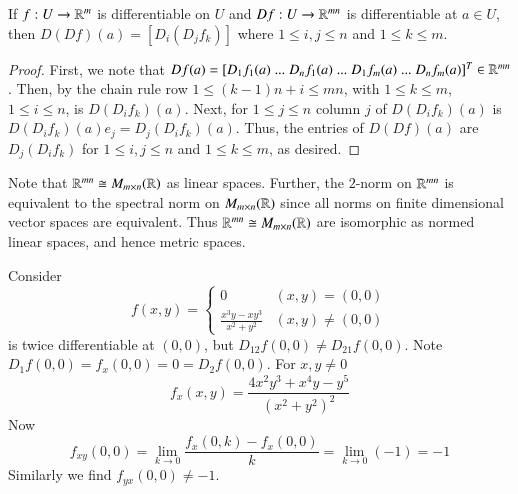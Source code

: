 \begin{prop}
    If $f:U\rightarrow \mathbb R^m$ is differentiable on $U$ and $Df:U\rightarrow \mathbb R^{mn}$ is differentiable at $a \in U$, then $D(Df)(a) = [D_i(D_jf_k)]$ where $1 \leq i,j\leq n$ and $1 \leq k \leq m$.
\end{prop}
\begin{proof}
    First, we note that $Df(a) = [D_1f_1(a)\;...\;D_nf_1(a)\;...\;D_1f_m(a)\;...\;D_nf_m(a)]^T \in \mathbb R^{mn}$. Then, by the chain rule row $1 \leq (k-1)n+i \leq mn$, with $1 \leq k \leq m$, $1\leq i \leq n$, is $D(D_if_{k})(a)$. Next, for $1 \leq j \leq n$ column $j$ of $D(D_if_{k})(a)$ is $D(D_if_{k})(a)e_j = D_j(D_if_k)(a)$. Thus, the entries of $D(Df)(a)$ are $D_j(D_if_k)$ for $1 \leq i,j \leq n$ and $1 \leq k \leq m$, as desired.
\end{proof}

Note that $\mathbb R^{mn}\cong M_{m\times n}(\mathbb R)$ as linear spaces. Further, the $2$-norm on $\mathbb R^{mn}$ is equivalent to the spectral norm on $M_{m\times n}(\mathbb R)$ since all norms on finite dimensional vector spaces are equivalent. Thus $\mathbb R^{mn}\cong M_{m\times n}(\mathbb R)$ are isomorphic as normed linear spaces, and hence metric spaces.

\begin{eg}
    Consider \begin{equation*}
        f(x,y) = \left\{\begin{array}{cc} 0 & (x,y) = (0,0) \\ \frac{x^3y - xy^3}{x^2+y^2} & (x,y) \neq (0,0)  \end{array}\right.
    \end{equation*}
    is twice differentiable at $(0,0)$, but $D_{12}f(0,0) \neq D_{21}f(0,0)$. Note $D_1f(0,0) = f_x(0,0) = 0 = D_2f(0,0)$. For $x,y \neq 0$ $$f_x(x,y) = \frac{4x^2y^3+x^4y-y^5}{(x^2+y^2)^2}$$ Now $$f_{xy}(0,0) = \lim\limits_{k\rightarrow 0}\frac{f_x(0,k)-f_x(0,0)}{k} = \lim\limits_{k\rightarrow 0}(-1) = -1$$ Similarly we find $f_{yx}(0,0) \neq -1$.
\end{eg}

